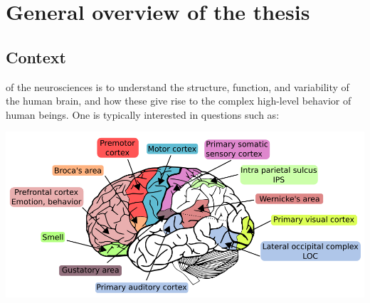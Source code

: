\chapter{General overview of the thesis}
\label{chap:intro}

\minitoc

\section{Context}

 of the neurosciences is to understand the structure, function, and variability of the human brain, and how these give rise to the complex high-level behavior of human beings. One is typically interested in questions such as:

 \begin{pagefigure}
    \centering
    \def\svgwidth{.23\columnwidth}
    
    \includegraphics[width=.74\linewidth]{figures/brain_function.png}    
    \caption{\textbf{Views of the brain} at different levels of detail. The brain is composed of (spatially connected) regions and  such regions are in turn composed of populations of neurons.
\textbf{Left:} Simplified view of a neuron.
A neuron (there are many types) has a cell body
called the \textit{soma}, many regions for receiving information from other neural cells
called \textit{dendrites}, and often an \textit{axon} (nerve
fiber) for transmitting information to other
cells (an axon can be longer than 1 meter in humans).
The information in the axon is transmitted through an electrical
signal called action potential, which is based on the electrical
properties of the neuronal membrane. Adapted from
\url{http://commons.wikimedia.org/}.
%      
\textbf{Right:} Each region is associated with a particular function
such as sensory areas (e.g.  visual cortex, auditory cortex) that
receive and process information from sensory organs, motors areas
(e.g. primary motor cortex, premotor cortex) that control the
movements of the subject, and associative areas (e.g. Broca’s area,
Wernicke's area) that process the high-level information related to
language production and understanding or the Intra Parietal Sulcus
--IPS-- that processes spatial information.
Adapted from \url{http://agaudi.files.wordpress.com/}.
}
\label{fig:neuron}
\end{pagefigure}

